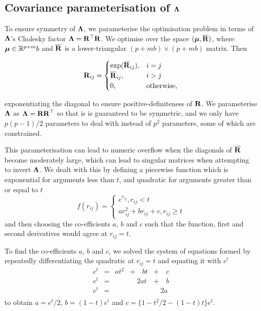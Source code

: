 	\subsection{Covariance parameterisation of ${\boldsymbol \Lambda}$}
	
	To ensure symmetry of ${\boldsymbol \Lambda}$, we parameterise the optimisation problem in terms of ${\boldsymbol \Lambda}$'s
	Cholesky factor  ${\boldsymbol \Lambda} = {\bf R}^\top {\bf R}$. We optimise over the space $({\boldsymbol \mu}, \overline{{\bf R}})$, where ${\boldsymbol \mu}
	\in {\mathbb{R}}^{p + m}b$ and $\overline{{\bf R}}$ is a lower-triangular $(p + mb) \times (p + mb)$ matrix. Then
			
	\begin{equation*}
		{\bf R}_{ij} =
		\begin{cases}
			\exp(\overline{{\bf R}}_{ij}), & i = j             \\
			\overline{{\bf R}}_{ij},       & i > j             \\
			0,                         & \text{otherwise}, 
		\end{cases}
	\end{equation*}
			
	\noindent exponentiating the diagonal to ensure positive-definiteness of ${\bf R}$. We parameterise ${\boldsymbol \Lambda}$
	as ${\boldsymbol \Lambda} = {\bf R} {\bf R}^\top$ so that is is guaranteed to be symmetric, and we only have $p(p-1)/2$ 
	parameters to deal with instead of $p^2$ parameters, some of which are constrained. 
	
	This parameterisation can lead to numeric overflow when the diagonals of $\overline{{\bf R}}$ become moderately
	large, which can lead to singular matrices when attempting to invert ${\boldsymbol \Lambda}$. We dealt with this by
	defining a piecewise function which is exponential for arguments less than $t$, and quadratic for arguments
	greater than or equal to $t$
	$$
	f(r_{ij}) =
	\begin{cases}
		e^{r_{ij}}, r_{ij} < t                   \\
		a r_{ij}^2 + b r_{ij} + c, r_{ij} \geq t 
	\end{cases}
	$$
	and then choosing the co-efficients $a$, $b$ and $c$ such that the function, first and second derivatives would
	agree at $r_{ij} = t$.
	
	To find the co-efficients $a$, $b$ and $c$, we solved the system of equations formed by repeatedly 
	differentiating the quadratic at $r_{ij} =  t$ and equating it with $e^t$
	$$
	\begin{array}{lllll}
		e^t & = & a t^2 & + \quad b t & + \quad c \\
		e^t & = &       & \quad 2a t  & + \quad b \\
		e^t & = &       &             & \quad 2a  \\
	\end{array}
	$$
	to obtain $a = e^t / 2$, $b = (1 - t) e^t$ and $c = \{1 - t^2/2 - (1 - t) t\} e^t$.
	
